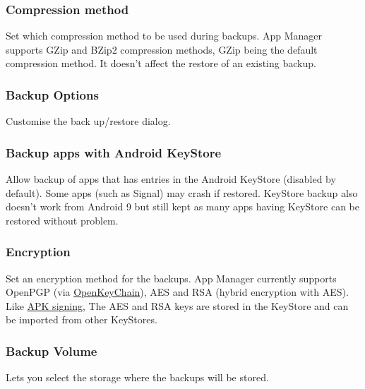\subsubsection{Compression method} %
Set which compression method to be used during backups.
App Manager supports GZip and BZip2 compression methods, GZip being the default compression method.
It doesn't affect the restore of an existing backup.

\subsubsection{Backup Options}\label{subsubsec:settings-backup-options} %
Customise the back up/restore dialog.

\subsubsection{Backup apps with Android KeyStore} %
Allow backup of apps that has entries in the Android KeyStore (disabled by default).
Some apps (such as Signal) may crash if restored.
KeyStore backup also doesn't work from Android 9 but still kept as many apps having KeyStore can be restored without problem.

\subsubsection{Encryption}\label{subsubsec:settings-encryption} %
Set an encryption method for the backups.
App Manager currently supports OpenPGP (via
\href{https://f-droid.org/packages/org.sufficientlysecure.keychain/}{OpenKeyChain}), AES and RSA (hybrid encryption with
AES).
Like \hyperref[subsec:apk-signing]{APK signing}, The AES and RSA keys are stored in the KeyStore and can be imported
from other KeyStores.

\subsubsection{Backup Volume}\label{subsubsec:backup-volume} %
Lets you select the storage where the backups will be stored.

